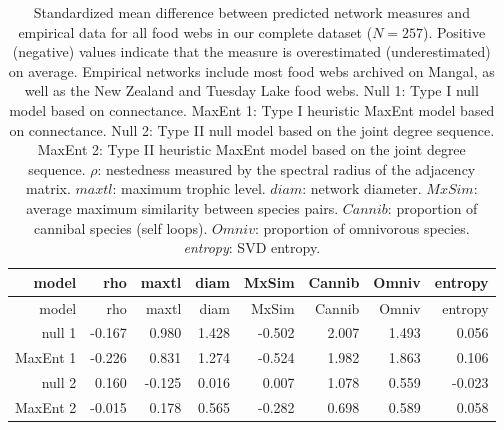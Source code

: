 \documentclass[10pt,oneside]{article}
\begin{document}
\hypertarget{tbl:measures_all}{}
\begin{longtable}[]{@{}rrrrrrrr@{}}
\caption{\label{tbl:measures_all}Standardized mean difference between
predicted network measures and empirical data for all food webs in our
complete dataset (\(N = 257\)). Positive (negative) values indicate that
the measure is overestimated (underestimated) on average. Empirical
networks include most food webs archived on Mangal, as well as the New
Zealand and Tuesday Lake food webs. Null 1: Type I null model based on
connectance. MaxEnt 1: Type I heuristic MaxEnt model based on
connectance. Null 2: Type II null model based on the joint degree
sequence. MaxEnt 2: Type II heuristic MaxEnt model based on the joint
degree sequence. \(\rho\): nestedness measured by the spectral radius of
the adjacency matrix. \(maxtl\): maximum trophic level. \(diam\):
network diameter. \(MxSim\): average maximum similarity between species
pairs. \(Cannib\): proportion of cannibal species (self loops).
\(Omniv\): proportion of omnivorous species. \emph{entropy}: SVD
entropy.}\tabularnewline
\toprule
model & rho & maxtl & diam & MxSim & Cannib & Omniv &
entropy\tabularnewline
\midrule
\endfirsthead
\toprule
model & rho & maxtl & diam & MxSim & Cannib & Omniv &
entropy\tabularnewline
\midrule
\endhead
null 1 & -0.167 & 0.980 & 1.428 & -0.502 & 2.007 & 1.493 &
0.056\tabularnewline
MaxEnt 1 & -0.226 & 0.831 & 1.274 & -0.524 & 1.982 & 1.863 &
0.106\tabularnewline
null 2 & 0.160 & -0.125 & 0.016 & 0.007 & 1.078 & 0.559 &
-0.023\tabularnewline
MaxEnt 2 & -0.015 & 0.178 & 0.565 & -0.282 & 0.698 & 0.589 &
0.058\tabularnewline
\bottomrule
\end{longtable}
\end{document}
